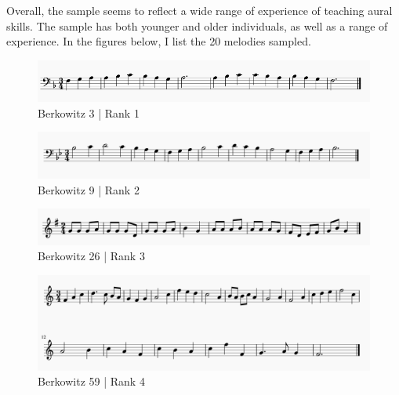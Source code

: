 \documentclass[]{book}
\begin{document}
Overall, the sample seems to reflect a wide range of experience of teaching aural skills.
The sample has both younger and older individuals, as well as a range of experience.
In the figures below, I list the 20 melodies sampled.

\begin{figure}

{\centering \includegraphics[width=1\linewidth]{img/survey_melodies/Berkowitz3} 

}

\caption{Berkowitz 3 | Rank 1}\label{fig:berk3}
\end{figure}

\begin{figure}

{\centering \includegraphics[width=1\linewidth]{img/survey_melodies/Berkowitz9} 

}

\caption{Berkowitz 9 | Rank 2}\label{fig:berk9}
\end{figure}

\begin{figure}

{\centering \includegraphics[width=1\linewidth]{img/survey_melodies/Berkowitz26} 

}

\caption{Berkowitz 26 | Rank 3}\label{fig:berk26}
\end{figure}

\begin{figure}

{\centering \includegraphics[width=1\linewidth]{img/survey_melodies/Berkowitz59} 

}

\caption{Berkowitz 59 | Rank 4}\label{fig:berk59}
\end{figure}
\end{document}
